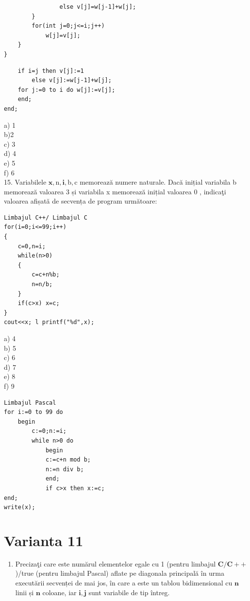 \documentclass[10pt]{article}
\begin{document}
\begin{verbatim}
                else v[j]=w[j-1]+w[j];
        }
        for(int j=0;j<=i;j++)
            w[j]=v[j];
    }
}
\end{verbatim}

\begin{verbatim}
    if i=j then v[j]:=1
        else v[j]:=w[j-1]+w[j];
    for j:=0 to i do w[j]:=v[j];
    end;
end;
\end{verbatim}

a) 1\\
b)2\\
c) 3\\
d) 4\\
e) 5\\
f) 6\\
15. Variabilele $\mathbf{x}, \mathrm{n}, \mathbf{i}, \mathrm{b}, \mathrm{c}$ memorează numere naturale. Dacă inițial variabila b memorează valoarea 3 și variabila x memorează inițial valoarea 0 , indicaţi valoarea afișată de secvența de program următoare:

\begin{verbatim}
Limbajul C++/ Limbajul C
for(i=0;i<=99;i++)
{
    c=0,n=i;
    while(n>0)
    {
        c=c+n%b;
        n=n/b;
    }
    if(c>x) x=c;
}
cout<<x; l printf("%d",x);
\end{verbatim}

a) 4\\
b) 5\\
c) 6\\
d) 7\\
e) 8\\
f) 9

\begin{verbatim}
Limbajul Pascal
for i:=0 to 99 do
    begin
        c:=0;n:=i;
        while n>0 do
            begin
            c:=c+n mod b;
            n:=n div b;
            end;
            if c>x then x:=c;
end;
write(x);
\end{verbatim}

\section*{Varianta 11}
\begin{enumerate}
  \item Precizaţi care este numărul elementelor egale cu 1 (pentru limbajul $\mathbf{C} / \mathbf{C}++$ )/true (pentru limbajul Pascal) aflate pe diagonala principală în urma executării secvenței de mai jos, în care a este un tablou bidimensional cu $\mathbf{n}$ linii și $\mathbf{n}$ coloane, iar $\mathbf{i}, \mathbf{j}$ sunt variabile de tip întreg.
\end{enumerate}
\end{document}
